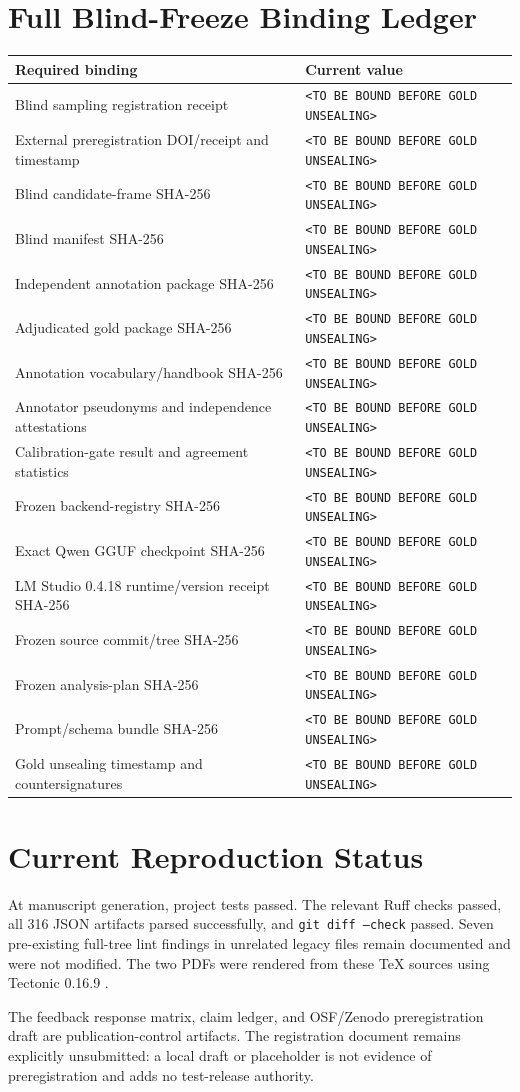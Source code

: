 \documentclass[11pt]{article}
\newcommand{\placeholder}{\texttt{<TO BE BOUND BEFORE GOLD UNSEALING>}}
\begin{document}
\section{Full Blind-Freeze Binding Ledger}
\label{app:blind-ledger}

\begin{longtable}{@{}>{\raggedright\arraybackslash}p{5.2cm}>{\raggedright\arraybackslash}p{10.0cm}@{}}
\toprule
Required binding & Current value \\
\midrule
\endhead
Blind sampling registration receipt & \placeholder \\
External preregistration DOI/receipt and timestamp & \placeholder \\
Blind candidate-frame SHA-256 & \placeholder \\
Blind manifest SHA-256 & \placeholder \\
Independent annotation package SHA-256 & \placeholder \\
Adjudicated gold package SHA-256 & \placeholder \\
Annotation vocabulary/handbook SHA-256 & \placeholder \\
Annotator pseudonyms and independence attestations & \placeholder \\
Calibration-gate result and agreement statistics & \placeholder \\
Frozen backend-registry SHA-256 & \placeholder \\
Exact Qwen GGUF checkpoint SHA-256 & \placeholder \\
LM Studio 0.4.18 runtime/version receipt SHA-256 & \placeholder \\
Frozen source commit/tree SHA-256 & \placeholder \\
Frozen analysis-plan SHA-256 & \placeholder \\
Prompt/schema bundle SHA-256 & \placeholder \\
Gold unsealing timestamp and countersignatures & \placeholder \\
\bottomrule
\end{longtable}

\section{Current Reproduction Status}

At manuscript generation, \FullTests{} project tests passed. The relevant Ruff
checks passed, all 316 JSON artifacts parsed successfully, and
\texttt{git diff --check} passed. Seven pre-existing full-tree lint findings in
unrelated legacy files remain documented and were not modified. The two PDFs were
rendered from these TeX sources using Tectonic 0.16.9 \cite{tectonic0169}.

The feedback response matrix, claim ledger, and OSF/Zenodo preregistration draft
are publication-control artifacts. The registration document remains explicitly
unsubmitted: a local draft or placeholder is not evidence of preregistration and
adds no test-release authority.



\end{document}
